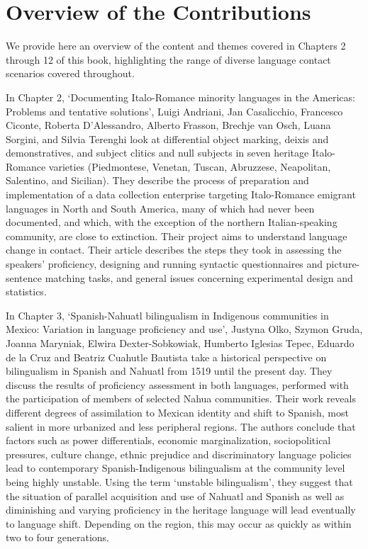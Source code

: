 \documentclass[output=paper]{langscibook}
\begin{document}
\section{Overview of the Contributions}
We provide here an overview of the content and themes covered in Chapters 2 through 12 of this book, highlighting the range of diverse language contact scenarios covered throughout.

In Chapter 2, `Documenting Italo-Romance minority languages in the Americas: Problems and tentative solutions’, Luigi Andriani, Jan Casalicchio, Francesco Ciconte, Roberta D’Alessandro, Alberto Frasson, Brechje van Osch, Luana Sorgini, and Silvia Terenghi look at differential object marking, deixis and demonstratives, and subject clitics and null subjects in seven heritage Italo-Romance varieties (Piedmontese, Venetan, Tuscan, Abruzzese, Neapolitan, Salentino, and Sicilian). They describe the process of preparation and implementation of a data collection enterprise targeting Italo-Romance emigrant languages in North and South America, many of which had never been documented, and which, with the exception of the northern Italian-speaking community, are close to extinction. Their project aims to understand language change in contact. Their article describes the steps they took in assessing the speakers' proficiency, designing and running syntactic questionnaires and picture-sentence matching tasks, and general issues concerning experimental design and statistics.

In Chapter 3, ‘Spanish-Nahuatl bilingualism in Indigenous communities in Mexico: Variation in language proficiency and use’, Justyna Olko, Szymon Gruda, Joanna Maryniak, Elwira Dexter-Sobkowiak, Humberto Iglesias Tepec, Eduardo de la Cruz and Beatriz Cuahutle Bautista take a historical perspective on bilingualism in Spanish and Nahuatl from 1519 until the present day. They discuss the results of proficiency assessment in both languages, performed with the participation of members of selected Nahua communities. Their work reveals different degrees of assimilation to Mexican identity and shift to Spanish, most salient in more urbanized and less peripheral regions. The authors conclude that factors such as power differentials, economic marginalization, sociopolitical pressures, culture change, ethnic prejudice and discriminatory language policies lead to contemporary Spanish-Indigenous bilingualism at the community level being highly unstable. Using the term `unstable bilingualism', they suggest that the situation of parallel acquisition and use of Nahuatl and Spanish as well as diminishing and varying proficiency in the heritage language will lead eventually to language shift. Depending on the region, this may occur as quickly as within two to four generations.
\end{document}
